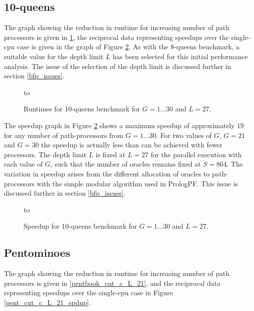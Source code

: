 \subsection{10-queens}

The graph showing the reduction in runtime for increasing number of 
path processors is given in \ref{queens10_cut_c_L_27},  the reciprocal data representing
speedups over the single-cpu case is given in the graph of Figure \ref{q10_cut_c_L_27_spdup}.
As with the 8-queens benchmark, a suitable value for the depth limit $L$ has been selected for this
initial performance analysis.  The issue of the selection of the depth limit is discussed further in
section \ref{bfp_issues}.

\begin{figure}[htbp]
\vspace{5mm} \hbox to 
\caption{Runtimes for 10-queens benchmark for $G=1\ldots 30$ and $L=27$.}
\vspace{5mm}
\label{queens10_cut_c_L_27}
\end{figure}

The speedup graph in Figure \ref{q10_cut_c_L_27_spdup} shows a maximum speedup of
approximately $19$ for
any number of path-processors from $G=1\ldots 30$. For two values of $G$, $G=21$
and $G=30$ the speedup is actually less than can be achieved with fewer processors. 
The depth limit $L$ is fixed
at $L=27$ for the parallel execution with each value of $G$, such that the number of oracles
remains fixed at $S=864$.  The variation in speedup arises from the different allocation of 
oracles to path-processors with the simple modular algorithm used in PrologPF.  This issue is 
discussed further in section \ref{bfp_issues}.

\begin{figure}[htbp]
\vspace{5mm} \hbox to 
\caption{Speedup for 10-queens benchmark for $G=1\ldots 30$ and $L=27$.}
\vspace{5mm}
\label{q10_cut_c_L_27_spdup}
\end{figure}


\subsection{Pentominoes}

The graph showing the reduction in runtime for increasing number of 
path processors is given in \ref{pentbook_cut_c_L_21},
and the reciprocal data representing
speedups over the single-cpu case in Figure \ref{pent_cut_c_L_21_spdup}.

